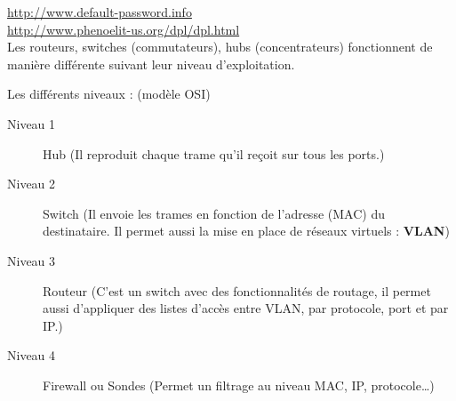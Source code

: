 \documentclass[a4paper,11pt]{article}				    %
\begin{document}
{
\url{http://www.default-password.info}\\
\url{http://www.phenoelit-us.org/dpl/dpl.html}
}
{
\\Les routeurs, switches (commutateurs), hubs (concentrateurs) fonctionnent de mani\`ere diff\'erente suivant leur niveau d'exploitation.
}
{
\begin{LARGE}Les diff\'erents niveaux : (mod\`ele OSI)\end{LARGE}
\begin{description}
    \item[Niveau 1] Hub (Il reproduit chaque trame qu'il re\c coit sur tous les ports.)
    \item[Niveau 2] Switch (Il envoie les trames en fonction de l'adresse (MAC) du destinataire. Il permet aussi la mise en place de r\'eseaux virtuels : \textbf{VLAN})
    \item[Niveau 3] Routeur (C'est un switch avec des fonctionnalit\'es de routage, il permet aussi d'appliquer des listes d'acc\`es entre VLAN, par protocole, port et par IP.)
    \item[Niveau 4] Firewall ou Sondes (Permet un filtrage au niveau MAC, IP, protocole\dots{})\\
\end{description}

}
\end{document}
